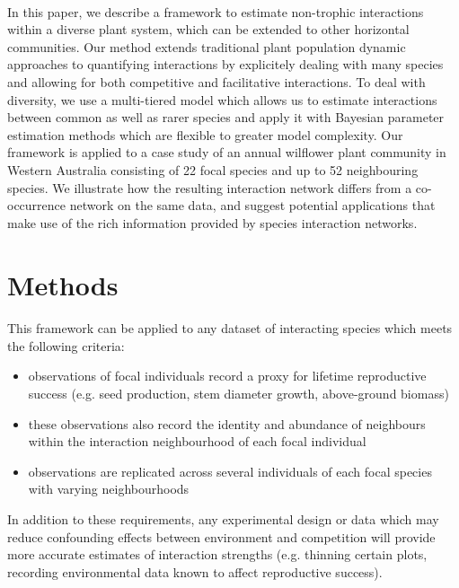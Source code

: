 \documentclass[a4,12pt]{article}
\begin{document}
    \paragraph{}
    In this paper, we describe a framework to estimate non-trophic interactions within a diverse plant system, which can be extended to other horizontal communities. Our method extends traditional plant population dynamic approaches to quantifying interactions by explicitely dealing with many species and allowing for both competitive and facilitative interactions. To deal with diversity, we use a multi-tiered model which allows us to estimate interactions between common as well as rarer species and apply it with Bayesian parameter estimation methods which are flexible to greater model complexity. Our framework is applied to a case study of an annual wilflower plant community in Western Australia consisting of 22 focal species and up to 52 neighbouring species. We illustrate how the resulting interaction network differs from a co-occurrence network on the same data, and suggest potential applications that make use of the rich information provided by species interaction networks.

    
\section{Methods}
    
    \paragraph{}
    This framework can be applied to any dataset of interacting species which meets the following criteria: 
    \begin{itemize}
        \item observations of focal individuals record a proxy for lifetime reproductive success (e.g. seed production, stem diameter growth, above-ground biomass)
        \item these observations also record the identity and abundance of neighbours within the interaction neighbourhood of each focal individual
        \item observations are replicated across several individuals of each focal species with varying neighbourhoods
    \end{itemize}
    In addition to these requirements, any experimental design or data which may reduce confounding effects between environment and competition will provide more accurate estimates of interaction strengths (e.g. thinning certain plots, recording environmental data known to affect reproductive success). 
    
\end{document}
